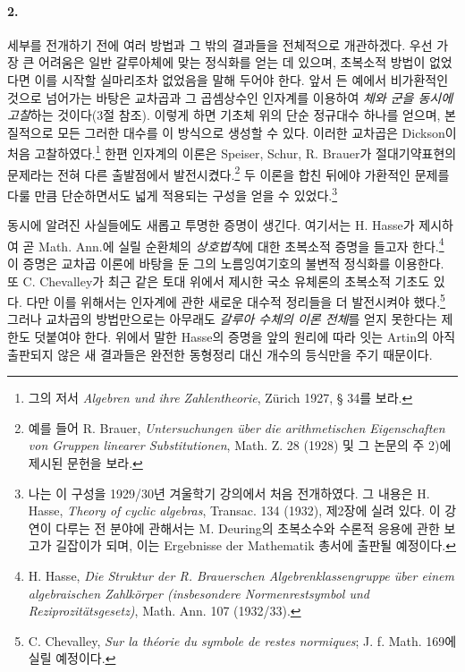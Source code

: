 \paragraph{2.}
세부를 전개하기 전에 여러 방법과 그 밖의 결과들을 전체적으로 개관하겠다. 우선 가장 큰 어려움은 일반 갈루아체에 맞는 정식화를 얻는 데 있으며, 초복소적 방법이 없었다면 이를 시작할 실마리조차 없었음을 말해 두어야 한다. 앞서 든 예에서 비가환적인 것으로 넘어가는 바탕은 \glqq{}교차곱\grqq{}과 그 곱셈상수인 \glqq{}인자계\grqq{}를 이용하여 \emph{체와 군을 동시에 고찰}하는 것이다(3절 참조). 이렇게 하면 기초체 위의 단순 정규대수 하나를 얻으며, 본질적으로 모든 그러한 대수를 이 방식으로 생성할 수 있다. 이러한 교차곱은 Dickson이 처음 고찰하였다.\footnote{그의 저서 \emph{Algebren und ihre Zahlentheorie}, Zürich 1927, § 34를 보라.} 한편 인자계의 이론은 Speiser, Schur, R. Brauer가 절대기약표현의 문제라는 전혀 다른 출발점에서 발전시켰다.\footnote{예를 들어 R. Brauer, \emph{Untersuchungen über die arithmetischen Eigenschaften von Gruppen linearer Substitutionen}, Math. Z. 28 (1928) 및 그 논문의 주 2)에 제시된 문헌을 보라.} 두 이론을 합친 뒤에야 가환적인 문제를 다룰 만큼 단순하면서도 넓게 적용되는 구성을 얻을 수 있었다.\footnote{나는 이 구성을 1929/30년 겨울학기 강의에서 처음 전개하였다. 그 내용은 H. Hasse, \emph{Theory of cyclic algebras}, Transac. 134 (1932), 제2장에 실려 있다. 이 강연이 다루는 전 분야에 관해서는 M. Deuring의 초복소수와 수론적 응용에 관한 보고가 길잡이가 되며, 이는 \glqq{}Ergebnisse der Mathematik\grqq{} 총서에 출판될 예정이다.}

동시에 알려진 사실들에도 새롭고 투명한 증명이 생긴다. 여기서는 H. Hasse가 제시하여 곧 Math. Ann.에 실릴 순환체의 \emph{상호법칙}에 대한 초복소적 증명을 들고자 한다.\footnote{H. Hasse, \emph{Die Struktur der R. Brauerschen Algebrenklassengruppe über einem algebraischen Zahlkörper (insbesondere Normenrestsymbol und Reziprozitätsgesetz)}, Math. Ann. 107 (1932/33).} 이 증명은 교차곱 이론에 바탕을 둔 그의 노름잉여기호의 불변적 정식화를 이용한다. 또 C. Chevalley가 최근 같은 토대 위에서 제시한 국소 유체론의 초복소적 기초도 있다. 다만 이를 위해서는 인자계에 관한 새로운 대수적 정리들을 더 발전시켜야 했다.\footnote{C. Chevalley, \emph{Sur la théorie du symbole de restes normiques}; J. f. Math. 169에 실릴 예정이다.} 그러나 교차곱의 방법만으로는 아무래도 \emph{갈루아 수체의 이론 전체}를 얻지 못한다는 제한도 덧붙여야 한다. 위에서 말한 Hasse의 증명을 앞의 원리에 따라 잇는 Artin의 아직 출판되지 않은 새 결과들은 완전한 동형정리 대신 개수의 등식만을 주기 때문이다.

